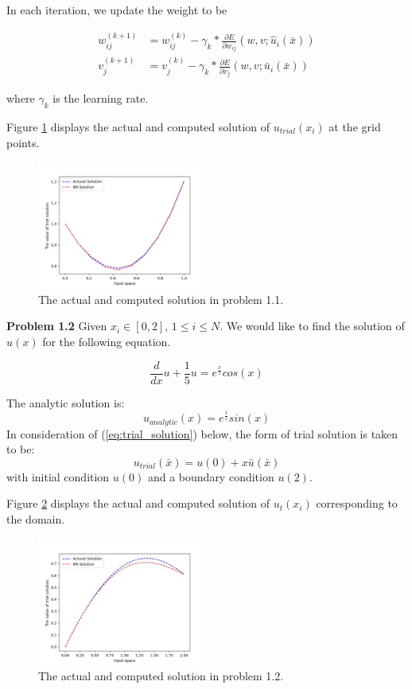 \documentclass{article}
\begin{document}
\medskip\noindent
In each iteration, we update the weight to be

\begin{equation}
\begin{aligned}
	w_{ij}^{(k+1)} &= w_{ij}^{(k)} - \gamma_{k}*\frac{\partial E}{\partial w_{ij}}(w,v;\hat{u}_i(\bar{x})) \\
	v_{j}^{(k+1)} &= v_{j}^{(k)} - \gamma_{k}*\frac{\partial E}{\partial v_{j}}(w,v;\bar{u}_i(\bar{x})) 
\end{aligned}
\end{equation}

where $\gamma_k$ is the learning rate.

\medskip \noindent
Figure \ref{fig:trial_ode1} displays the actual and computed solution of $u_{trial}(x_i)$ at the grid points.
\begin{figure}
	\centering
	\includegraphics[width=0.5\textwidth]{ode_1.png}
	\caption{The actual and computed solution in problem 1.1. }
	\label{fig:trial_ode1}
\end{figure}

\medskip \noindent
\textbf{Problem 1.2} Given $x_i \in [0,2]$, $1 \leq i \leq N$. We would like to find the solution of $u(x)$ for the following equation.

\[\frac{d}{dx} u + \frac{1}{5} u = e^{\frac{x}{5}}cos(x)\]

\medskip \noindent
The analytic solution is:
\[u_{analytic}(x) = e^{\frac{1}{5}}sin(x) \]
In consideration of (\ref{eq:trial_solution}) below, the form of trial solution is taken to be:
\[u_{trial}(\bar{x}) = u(0) + x\bar{u}(\bar{x})\] with initial condition $u(0)$ and a boundary condition $u(2)$.

\medspace \noindent
Figure \ref{fig:trial_ode2} displays the actual and computed solution of $u _t(x_i)$ corresponding to the domain.

\begin{figure}
	\centering
	\includegraphics[width=0.5\textwidth]{ode_2.png}
	\caption{The actual and computed solution in problem 1.2. }
	\label{fig:trial_ode2}
\end{figure}
\end{document}
